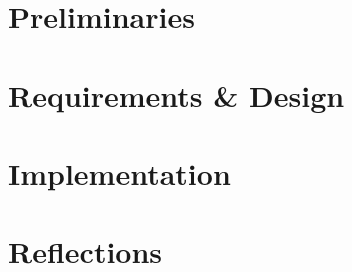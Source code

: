 


\pagestyle{empty} %





%

\cleardoublepage
{}
\pagestyle{fancy} %
\setcounter{tocdepth}{1}
\tableofcontents
\cleardoublepage





\part{Preliminaries}

\part{Requirements \& Design}

\part{Implementation}

\part{Reflections}


\printbibliography[heading=bibintoc]
\label{bib:mybiblio}

\appendix
{}

\label{lastpage}


